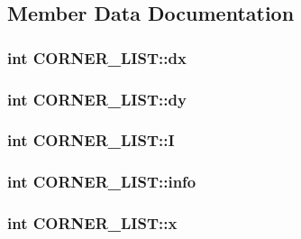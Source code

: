 \subsection{Member Data Documentation}
\hypertarget{structCORNER__LIST_a0bf28acc256ebc09a331ad18635dc89a}{
\subsubsection[{dx}]{\setlength{\rightskip}{0pt plus 5cm}int C\-O\-R\-N\-E\-R\-\_\-\-L\-I\-S\-T\-::dx}}\label{structCORNER__LIST_a0bf28acc256ebc09a331ad18635dc89a}
\hypertarget{structCORNER__LIST_a12ee12316c81880eaf34117ad3cd01a6}{
\subsubsection[{dy}]{\setlength{\rightskip}{0pt plus 5cm}int C\-O\-R\-N\-E\-R\-\_\-\-L\-I\-S\-T\-::dy}}\label{structCORNER__LIST_a12ee12316c81880eaf34117ad3cd01a6}
\hypertarget{structCORNER__LIST_a3f0e11efe472ee83cdebd15321f2c5ce}{
\subsubsection[{I}]{\setlength{\rightskip}{0pt plus 5cm}int C\-O\-R\-N\-E\-R\-\_\-\-L\-I\-S\-T\-::\-I}}\label{structCORNER__LIST_a3f0e11efe472ee83cdebd15321f2c5ce}
\hypertarget{structCORNER__LIST_aec3658f1e09309d7944886a84c2a7c50}{
\subsubsection[{info}]{\setlength{\rightskip}{0pt plus 5cm}int C\-O\-R\-N\-E\-R\-\_\-\-L\-I\-S\-T\-::info}}\label{structCORNER__LIST_aec3658f1e09309d7944886a84c2a7c50}
\hypertarget{structCORNER__LIST_a26aa1a7fb76aa067ff75ec00f52a9270}{
\subsubsection[{x}]{\setlength{\rightskip}{0pt plus 5cm}int C\-O\-R\-N\-E\-R\-\_\-\-L\-I\-S\-T\-::x}}\label{structCORNER__LIST_a26aa1a7fb76aa067ff75ec00f52a9270}
